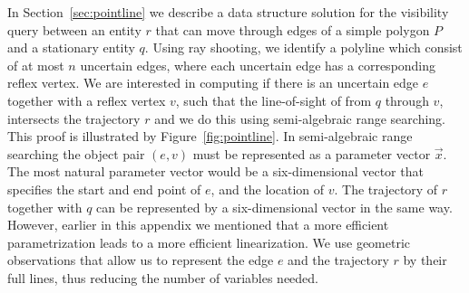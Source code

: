 \documentclass[UKenglish]{lipics-v2019}
\begin{document}
In Section~\ref{sec:pointline} we describe a data structure solution for the visibility query between an entity $r$ that can move through edges of a simple polygon $P$ and a stationary entity $q$. Using ray shooting, we identify a polyline which consist of at most $n$ uncertain edges, where each uncertain edge has a corresponding reflex vertex. 
We are interested in computing if there is an uncertain edge $e$ together with a reflex vertex $v$, such that the line-of-sight of from $q$ through $v$, intersects the trajectory $r$ and we do this using semi-algebraic range searching. This proof is illustrated by Figure~\ref{fig:pointline}. In semi-algebraic range searching the object pair $(e,v)$ must be represented as a parameter vector $\vec{x}$. The most natural parameter vector would be a six-dimensional vector that specifies the start and end point of $e$, and the location of $v$. The trajectory of $r$ together with $q$ can be represented by a six-dimensional vector in the same way. However, earlier in this appendix we mentioned that a more efficient parametrization leads to a more efficient linearization. We use geometric observations that allow us to represent the edge $e$ and the trajectory $r$ by their full lines, thus reducing the number of variables needed.
\end{document}
